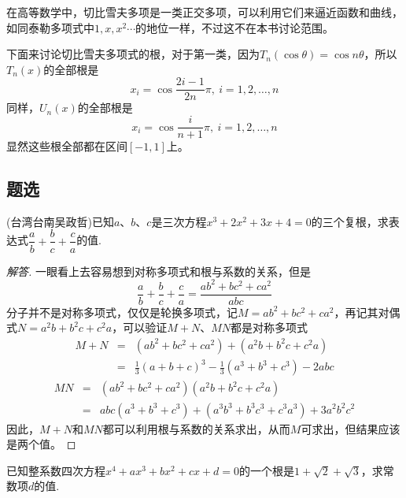 在高等数学中，切比雪夫多项是一类正交多项，可以利用它们来逼近函数和曲线，如同泰勒多项式中$1,x,x^2\cdots$的地位一样，不过这不在本书讨论范围。

下面来讨论切比雪夫多项式的根，对于第一类，因为$T_n(\cos{\theta})=\cos{n\theta}$，所以$T_n(x)$的全部根是
\begin{equation*}
  x_i=\cos{\frac{2i-1}{2n}\pi}, \  i=1,2,\ldots,n
\end{equation*}
同样，$U_n(x)$的全部根是
\begin{equation*}
  x_i=\cos{\frac{i}{n+1}\pi}, \  i=1,2,\ldots,n
\end{equation*}
显然这些根全部都在区间$[-1,1]$上。



\subsection{题选}
\label{sec:exercises-for-polynome}


\begin{exercise}
  (台湾台南吴政哲)已知$a$、$b$、$c$是三次方程$x^3+2x^2+3x+4=0$的三个复根，求表达式$\dfrac{a}{b}+\dfrac{b}{c}+\dfrac{c}{a}$的值.
\end{exercise}

\exerciseFrom[\url{http://kuing.orzweb.net/viewthread.php?tid=4850}]

\exerciseSolvedDate[2017-09-05]

\begin{proof}[解答]
  一眼看上去容易想到对称多项式和根与系数的关系，但是
  \[ \frac{a}{b}+\frac{b}{c}+\frac{c}{a} = \frac{ab^2+bc^2+ca^2}{abc} \]
  分子并不是对称多项式，仅仅是轮换多项式，记$M=ab^2+bc^2+ca^2$，再记其对偶式$N=a^2b+b^2c+c^2a$，可以验证$M+N$、$MN$都是对称多项式
  \begin{eqnarray*}
    M+N & = & (ab^2+bc^2+ca^2) + (a^2b+b^2c+c^2a) \\
    & = & \frac{1}{3}(a+b+c)^3-\frac{1}{3}(a^3+b^3+c^3)-2abc
  \end{eqnarray*}
  \begin{eqnarray*}
    MN & = &(ab^2+bc^2+ca^2)(a^2b+b^2c+c^2a) \\
    & = & abc(a^3+b^3+c^3)+(a^3b^3+b^3c^3+c^3a^3)+3a^2b^2c^2
  \end{eqnarray*}
  因此，$M+N$和$MN$都可以利用根与系数的关系求出，从而$M$可求出，但结果应该是两个值。
\end{proof}

\begin{exercise}
  已知整系数四次方程$x^4+ax^3+bx^2+cx+d=0$的一个根是$1+\sqrt{2}+\sqrt{3}$，求常数项$d$的值.
\end{exercise}

